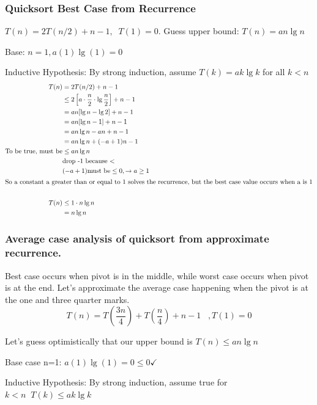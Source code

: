 \documentclass[english, 10pt]{article}
\begin{document}
\subsubsection{Quicksort Best Case from Recurrence}
$T(n) = 2T(n/2)+n-1, \;\;T(1)=0$. Guess upper bound: $T(n)=an\lg n$


Base: $n=1 , a(1)\lg(1)=0$

Inductive Hypothesis: By strong induction, assume $T(k) = ak\lg k$ for all $k<n$
\begin{align*}
    T(n)&= 2T(n/2)+n-1 \\
    &\le 2\left[ a\cdot \frac{n}{2} \cdot\lg\frac{n}{2} \right] +n-1 \\
    &= an[\lg n - \lg 2] +n-1 \\
    &= an[\lg n -1] +n-1 \\
    &= an\lg n -an +n -1 \\
    &= an\lg n +(-a+1)n -1 \\
    \text{To be true, must be} &\le an\lg n \\
    &\text{drop -1 because <} \\
    &(-a+1) \text{must be} \le 0, \rightarrow a\ge1 \\
    \intertext{So a constant a greater than or equal to 1 solves the recurrence, but the best case value occurs when a is 1} \\
    T(n) &\le 1\cdot n\lg n \\
    &=n\lg n
\end{align*}

\subsubsection{Average case analysis of quicksort from approximate recurrence.}
Best case occurs when pivot is in the middle, while worst case occurs when
pivot is at the end. Let's approximate the average case happening when the
pivot is at the one and three quarter marks.
$$T(n) = T(\frac{3n}{4}) + T(\frac{n}{4}) +n -1 \;\;\;,T(1)=0$$


Let's guess optimistically that our upper bound is $T(n) \le an\lg n$

Base case n=1: $a(1)\lg(1) = 0 \le 0 \checkmark$

Inductive Hypothesis: By strong induction, assume true for $k<n\;\; T(k) \le ak\lg k$
\end{document}
